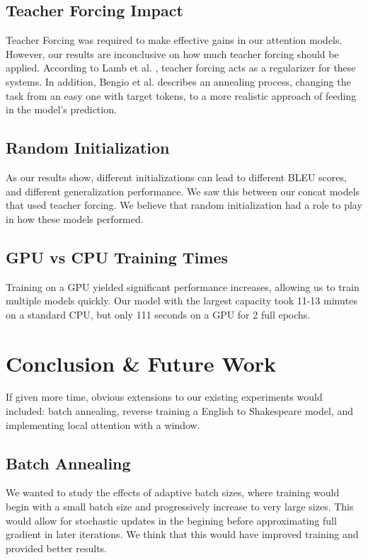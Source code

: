 \documentclass[twoside,twocolumn]{article}
\begin{document}
\subsection{Teacher Forcing Impact}
Teacher Forcing was required to make effective gains in our attention models.
However, our results are inconclusive on how much teacher forcing should be
applied. According to Lamb et al. \cite{lamb2016professor}, teacher forcing
acts as a regularizer for these systems. In addition, Bengio et al.
\cite{DBLP:journals/corr/BengioVJS15} describes an annealing
process, changing the task from an easy one with target tokens, to a more
realistic approach of feeding in the model's prediction.

\subsection{Random Initialization}
As our results show, different initializations can lead to different BLEU
scores, and different generalization performance. We saw this between our
concat models that used teacher forcing. We believe that random initialization
had a role to play in how these models performed.
\subsection{GPU vs CPU Training Times}
Training on a GPU yielded significant performance increases, allowing us to
train multiple models quickly. Our model with the largest capacity took 11-13
minutes on a standard CPU, but only 111 seconds on a GPU for 2 full epochs.
\section{Conclusion \& Future Work}
\label{sec:conclusion}
If given more time, obvious extensions to our existing experiments would
included: batch annealing, reverse training a English to Shakespeare model,
and implementing local attention with a window.
\subsection{Batch Annealing}
We wanted to study the effects of adaptive batch sizes, where training would
begin with a small batch size and progressively increase to very large sizes.
This would allow for stochastic updates in the begining before approximating
full gradient in later iterations. We think that this would have improved
training and provided better results.
\end{document}
